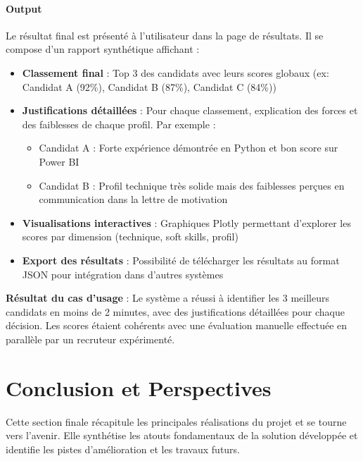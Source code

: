 \documentclass{rapportECL}
\begin{document}
\subsection{Output}

Le résultat final est présenté à l'utilisateur dans la page de résultats. Il se compose d'un rapport synthétique affichant :

\begin{itemize}[leftmargin=*]
    \item \textbf{Classement final} : Top 3 des candidats avec leurs scores globaux (ex: Candidat A (92\%), Candidat B (87\%), Candidat C (84\%))
    
    \item \textbf{Justifications détaillées} : Pour chaque classement, explication des forces et des faiblesses de chaque profil. Par exemple :
    \begin{itemize}
        \item Candidat A : Forte expérience démontrée en Python et bon score sur Power BI
        \item Candidat B : Profil technique très solide mais des faiblesses perçues en communication dans la lettre de motivation
    \end{itemize}
    
    \item \textbf{Visualisations interactives} : Graphiques Plotly permettant d'explorer les scores par dimension (technique, soft skills, profil)
    
    \item \textbf{Export des résultats} : Possibilité de télécharger les résultats au format JSON pour intégration dans d'autres systèmes
\end{itemize}

\begin{successbox}
\textbf{Résultat du cas d'usage} : Le système a réussi à identifier les 3 meilleurs candidats en moins de 2 minutes, avec des justifications détaillées pour chaque décision. Les scores étaient cohérents avec une évaluation manuelle effectuée en parallèle par un recruteur expérimenté.
\end{successbox}

\newpage

\part{Conclusion et Perspectives}

Cette section finale récapitule les principales réalisations du projet et se tourne vers l'avenir. Elle synthétise les atouts fondamentaux de la solution développée et identifie les pistes d'amélioration et les travaux futurs.
\end{document}
